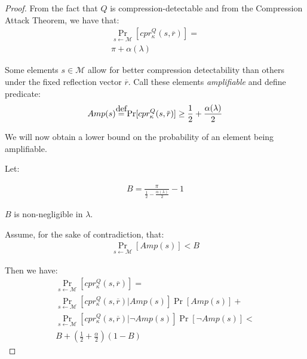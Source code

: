 \begin{proof}

From the fact that $Q$ is compression-detectable and from the Compression Attack Theorem, we have that:
\begin{align*}
    \Pr_{s \leftarrow \mathcal{M}}
         [cpr^Q_{\kappa}(s, \overbar{r})]
    =\\
    \pi + \alpha(\lambda)
\end{align*}

Some elements $s \in \mathcal{M}$ allow for better compression detectability than others under the fixed
reflection vector $\overbar{r}$. Call these elements \textit{amplifiable} and define predicate:
\begin{align*}
    Amp(s) \defeq
    \Pr[cpr^Q_{\kappa}
     (s, \overbar{r})]
    \geq
    \frac{1}{2} + \frac{\alpha(\lambda)}{2}
\end{align*}

We will now obtain a lower bound on the probability of an element being amplifiable.

Let:

\begin{align*}
    B = \frac{\pi}{\frac{1}{2} - \frac{\alpha(\lambda)}{2}} - 1
\end{align*}

$B$ is non-negligible in $\lambda$.

Assume, for the sake of contradiction, that:
\begin{align*}
    \Pr_{s \leftarrow \mathcal{M}}
    [Amp(s)] < B
\end{align*}

Then we have:
\begin{align*}
    \Pr_{s \leftarrow \mathcal{M}}
         [cpr^Q_{\kappa}(s, \overbar{r})]
    =\\
    \Pr_{s \leftarrow \mathcal{M}}
         [cpr^Q_{\kappa}(s, \overbar{r})|Amp(s)]\Pr[Amp(s)]
    +\\
    \Pr_{s \leftarrow \mathcal{M}}
         [cpr^Q_{\kappa}(s, \overbar{r})|\lnot Amp(s)]\Pr[\lnot Amp(s)]
    <\\
    B + (\frac{1}{2} + \frac{\alpha}{2})(1 - B)
\end{align*}


\end{proof}
